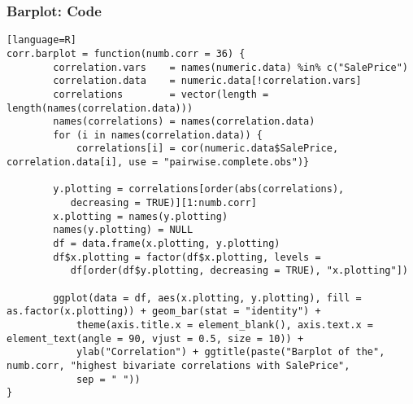 \begin{frame}[fragile]
\frametitle{Barplot: Code}

\begin{lstlisting}[basicstyle=\tiny][language=R]
corr.barplot = function(numb.corr = 36) {
        correlation.vars    = names(numeric.data) %in% c("SalePrice")
        correlation.data    = numeric.data[!correlation.vars]                  
        correlations        = vector(length = 										length(names(correlation.data)))
        names(correlations) = names(correlation.data)        
        for (i in names(correlation.data)) {                                   
            correlations[i] = cor(numeric.data$SalePrice, 							correlation.data[i], use = "pairwise.complete.obs")}        
        
        y.plotting = correlations[order(abs(correlations), 
           decreasing = TRUE)][1:numb.corr]
        x.plotting = names(y.plotting)
        names(y.plotting) = NULL
        df = data.frame(x.plotting, y.plotting)
        df$x.plotting = factor(df$x.plotting, levels = 
           df[order(df$y.plotting, decreasing = TRUE), "x.plotting"])
        
        ggplot(data = df, aes(x.plotting, y.plotting), fill = as.factor(x.plotting)) + geom_bar(stat = "identity") + 
            theme(axis.title.x = element_blank(), axis.text.x = element_text(angle = 90, vjust = 0.5, size = 10)) + 
            ylab("Correlation") + ggtitle(paste("Barplot of the", numb.corr, "highest bivariate correlations with SalePrice", 
            sep = " "))
}

\end{lstlisting}

\end{frame}



